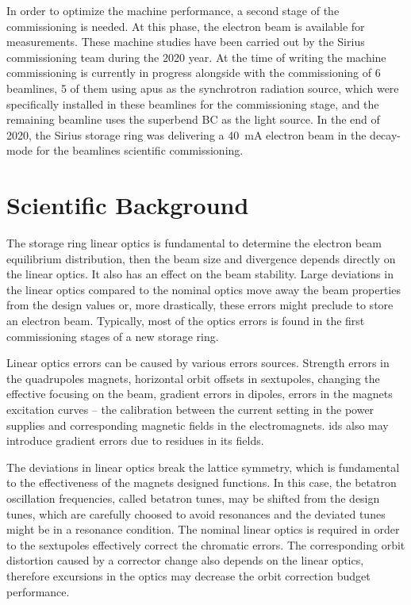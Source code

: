 In order to optimize the machine performance, a second stage of the commissioning is needed. At this phase, the electron beam is available for measurements. These machine studies have been carried out by the Sirius commissioning team during the 2020 year. At the time of writing the machine commissioning is currently in progress alongside with the commissioning of 6 beamlines, 5 of them using \glspl{apu} as the synchrotron radiation source, which were specifically installed in these beamlines for the commissioning stage, and the remaining beamline uses the superbend BC as the light source. In the end of 2020, the Sirius storage ring was delivering a \SI{40}{\milli\ampere} electron beam in the decay-mode for the beamlines scientific commissioning.
\section{Scientific Background}\label{sec:background}
The storage ring linear optics is fundamental to determine the electron beam equilibrium distribution, then the beam size and divergence depends directly on the linear optics. It also has an effect on the beam stability. Large deviations in the linear optics compared to the nominal optics move away the beam properties from the design values or, more drastically, these errors might preclude to store an electron beam. Typically, most of the optics errors is found in the first commissioning stages of a new storage ring.

Linear optics errors can be caused by various errors sources. Strength errors in the quadrupoles magnets, horizontal orbit offsets in sextupoles, changing the effective focusing on the beam, gradient errors in dipoles, errors in the magnets excitation curves -- the calibration between the current setting in the power supplies and corresponding magnetic fields in the electromagnets. \glspl{id} also may introduce gradient errors due to residues in its fields.

The deviations in linear optics break the lattice symmetry, which is fundamental to the effectiveness of the magnets designed functions. In this case, the betatron oscillation frequencies, called betatron tunes, may be shifted from the design tunes, which are carefully choosed to avoid resonances and the deviated tunes might be in a resonance condition. The nominal linear optics is required in order to the sextupoles effectively correct the chromatic errors. The corresponding orbit distortion caused by a corrector change also depends on the linear optics, therefore excursions in the optics may decrease the orbit correction budget performance.

